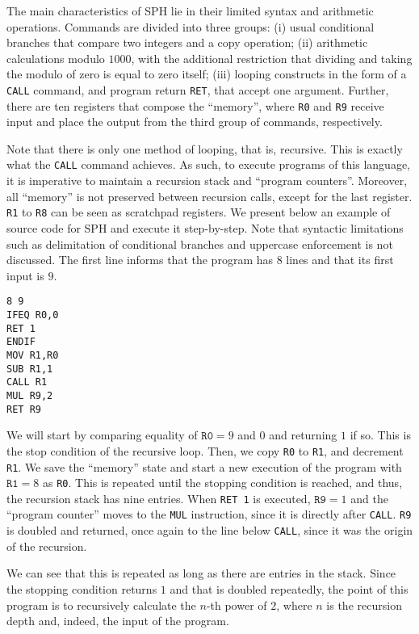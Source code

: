 \documentclass[12pt]{article}
\begin{document}
The main characteristics of SPH lie in their limited syntax and arithmetic operations. Commands are divided into three groups: (i) usual conditional branches that compare two integers and a copy operation; (ii) arithmetic calculations modulo $1000$, with the additional restriction that dividing and taking the modulo of zero is equal to zero itself; (iii) looping constructs in the form of a \texttt{CALL} command, and program return \texttt{RET}, that accept one argument. Further, there are ten registers that compose the ``memory'', where \texttt{R0} and \texttt{R9} receive input and place the output from the third group of commands, respectively.

Note that there is only one method of looping, that is, recursive. This is exactly what the \texttt{CALL} command achieves. As such, to execute programs of this language, it is imperative to maintain a recursion stack and ``program counters''. Moreover, all ``memory'' is not preserved between recursion calls, except for the last register. \texttt{R1} to \texttt{R8} can be seen as scratchpad registers. We present below an example of source code for SPH and execute it step-by-step. Note that syntactic limitations such as delimitation of conditional branches and uppercase enforcement is not discussed. The first line informs that the program has $8$ lines and that its first input is $9$.

{\footnotesize
\begin{verbatim}
8 9
IFEQ R0,0
RET 1
ENDIF
MOV R1,R0
SUB R1,1
CALL R1
MUL R9,2
RET R9
\end{verbatim}}

We will start by comparing equality of $\texttt{R0} = 9$ and $0$ and returning $1$ if so. This is the stop condition of the recursive loop. Then, we copy \texttt{R0} to \texttt{R1}, and decrement \texttt{R1}. We save the ``memory'' state and start a new execution of the program with $\texttt{R1} = 8$ as \texttt{R0}. This is repeated until the stopping condition is reached, and thus, the recursion stack has nine entries. When \texttt{RET 1} is executed, $\texttt{R9} = 1$ and the ``program counter'' moves to the \texttt{MUL} instruction, since it is directly after \texttt{CALL}. \texttt{R9} is doubled and returned, once again to the line below \texttt{CALL}, since it was the origin of the recursion. 

We can see that this is repeated as long as there are entries in the stack. Since the stopping condition returns $1$ and that is doubled repeatedly, the point of this program is to recursively calculate the $n$-th power of $2$, where $n$ is the recursion depth and, indeed, the input of the program.
\end{document}
